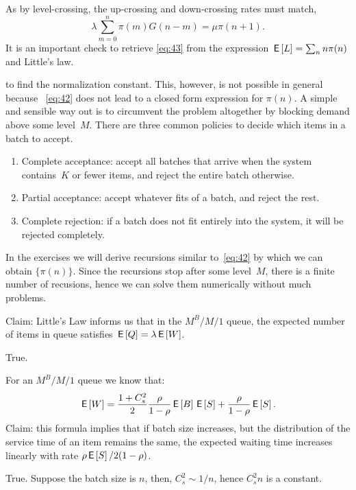 \documentclass[stochastic-or.tex]{subfiles}
\begin{document}
As by level-crossing, the up-crossing and down-crossing rates must match,
\begin{equation}\label{eq:42}
\lambda \sum_{m=0}^n \pi(m) G(n-m) = \mu \pi(n+1).
\end{equation}
It is an important check to retrieve \cref{eq:43} from the expression $\,\mathsf{E}\left[L\right] = \sum_{n} n \pi(n)$ and Little's law.

 to find the normalization constant.
This, however, is not possible in general because ~\cref{eq:42} does not lead to a closed form expression for $\pi(n)$.
A simple and sensible way out is to circumvent the problem altogether by blocking demand above some level~$M$.
There are three common policies to decide which items in a batch to accept.
\begin{enumerate}
\item Complete acceptance: accept all batches that arrive when the system contains~$K$ or fewer items, and reject the entire batch otherwise.
\item Partial acceptance: accept whatever fits of a batch, and reject the rest.
\item Complete rejection: if a batch does not fit entirely into the system, it will be rejected completely.
\end{enumerate}
In the exercises we will derive recursions similar to~\cref{eq:42} by which we can obtain $\{\pi(n)\}$.
Since the recursions stop after some level~$M$, there is a finite number of recusions, hence we can solve them numerically without much problems.


\begin{truefalse}
Claim:   Little's Law informs us that in the $M^{B}/M/1$ queue, the expected number of items in queue satisfies $\,\mathsf{E}\left[Q\right]=\lambda\,\mathsf{E}\left[W\right]$.
    \begin{solution}
        True.
    \end{solution}
\end{truefalse}

\begin{truefalse}
    For an $M^B/M/1$ queue we know that:
    $$
    \,\mathsf{E}\left[W\right]=\frac{1+C_s^2}{2}\frac{\rho}{1-\rho}\,\mathsf{E}\left[B\right]\,\mathsf{E}\left[S\right]+\frac{\rho}{1-\rho}\,\mathsf{E}\left[S\right].
    $$
    Claim: this formula implies that if  batch size increases, but the distribution of the service time of an item remains the same, the expected waiting time increases linearly with rate $\rho \,\mathsf{E}\left[S\right]/2(1-\rho)$.
    \begin{solution}
        True. Suppose  the batch size is $n$, then, $C_{s}^{2} \sim 1/n$, hence $C^2_s n$ is a constant.
    \end{solution}
\end{truefalse}
\end{document}
